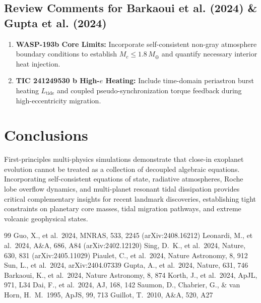 \documentclass[twocolumn,10pt,a4paper]{article}
\begin{document}
\subsection{Review Comments for Barkaoui et al. (2024) \& Gupta et al. (2024)}
\begin{enumerate}
    \item \textbf{WASP-193b Core Limits:} Incorporate self-consistent non-gray atmosphere boundary conditions to establish $M_c \le 1.8\,M_\oplus$ and quantify necessary interior heat injection.
    \item \textbf{TIC 241249530 b High-$e$ Heating:} Include time-domain periastron burst heating $L_{\text{tide}}$ and coupled pseudo-synchronization torque feedback during high-eccentricity migration.
\end{enumerate}

\section{Conclusions}
First-principles multi-physics simulations demonstrate that close-in exoplanet evolution cannot be treated as a collection of decoupled algebraic equations. Incorporating self-consistent equations of state, radiative atmospheres, Roche lobe overflow dynamics, and multi-planet resonant tidal dissipation provides critical complementary insights for recent landmark discoveries, establishing tight constraints on planetary core masses, tidal migration pathways, and extreme volcanic geophysical states.

\begin{thebibliography}{99}
 Guo, X., et al.\ 2024, MNRAS, 533, 2245 (arXiv:2408.16212)
 Leonardi, M., et al.\ 2024, A\&A, 686, A84 (arXiv:2402.12120)
 Sing, D.~K., et al.\ 2024, Nature, 630, 831 (arXiv:2405.11029)
 Piaulet, C., et al.\ 2024, Nature Astronomy, 8, 912
 Sun, L., et al.\ 2024, arXiv:2404.07339
 Gupta, A., et al.\ 2024, Nature, 631, 746
 Barkaoui, K., et al.\ 2024, Nature Astronomy, 8, 874
 Korth, J., et al.\ 2024, ApJL, 971, L34
 Dai, F., et al.\ 2024, AJ, 168, 142
 Saumon, D., Chabrier, G., \& van Horn, H.~M.\ 1995, ApJS, 99, 713
 Guillot, T.\ 2010, A\&A, 520, A27
\end{thebibliography}
\end{document}
